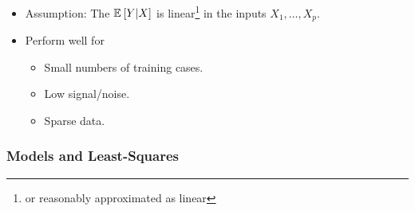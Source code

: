 \documentclass[11pt]{article}
\begin{document}

\begin{itemize}
	\item Assumption: The  $\mathbb{E}_{}\left[Y|X\right]$ is linear\footnote{or reasonably approximated as linear} in the inputs $X_1, \ldots, X_p$. 
	\item Perform well for\textellipsis
	\begin{itemize}
		\item Small numbers of training cases.
		\item Low signal/noise.
		\item Sparse data. 
	\end{itemize}
\end{itemize}

\subsubsection{Models and Least-Squares}
\end{document}
